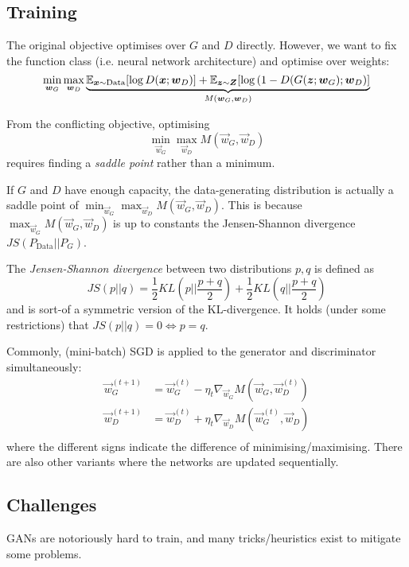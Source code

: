 \subsection{Training}
The original objective optimises over
$G$ and $D$ directly.
However, we want to fix the function class
(i.e. neural network architecture)
and optimise over weights:
\begin{equation*}
\min_{\boldsymbol{w}_G}{\max_{\boldsymbol{w}_D}{
		\underbrace{
			\mathbb{E}_{\boldsymbol{x} \sim \text{Data}}[\log{D(\boldsymbol{x}; \boldsymbol{w}_D)}]
			+
			\mathbb{E}_{\boldsymbol{z} \sim \boldsymbol{Z}}[\log{(1 - D(G(\boldsymbol{z}; \boldsymbol{w}_G); \boldsymbol{w}_D)}]
		}_{M(\boldsymbol{w}_G, \boldsymbol{w}_D)}
}}
\end{equation*}

From the conflicting objective,
optimising
\begin{equation*}
\min_{\vec{w}_G}{\max_{\vec{w}_D}{
		M(\vec{w}_G, \vec{w}_D)
}}
\end{equation*}
requires finding a \emph{saddle point}
rather than a minimum.

If $G$ and $D$ have enough capacity,
the data-generating distribution is
actually a saddle point of
$\min_{\vec{w}_G}{\max_{\vec{w}_D}{M(\vec{w}_G, \vec{w}_D)}}$.
This is because
$\max_{\vec{w}_G}{M(\vec{w}_G, \vec{w}_D)}$ is
up to constants the Jensen-Shannon divergence
$JS(P_\text{Data} || P_G)$.

The \emph{Jensen-Shannon divergence} between
two distributions $p, q$ is defined as
\begin{equation*}
JS(p || q) =
\frac{1}{2} KL(p || \frac{p+q}{2})
+
\frac{1}{2} KL(q || \frac{p+q}{2})
\end{equation*}
and is sort-of a symmetric version
of the KL-divergence.
It holds (under some restrictions) that
$JS(p || q) = 0 \Leftrightarrow p = q$.

Commonly, (mini-batch) SGD is applied to
the generator and discriminator simultaneously:
\begin{align*}
\vec{w}_G^{(t+1)} &= \vec{w}_G^{(t)} - \eta_t \nabla_{\vec{w}_G} M(\vec{w}_G, \vec{w}_D^{(t)}) \\
\vec{w}_D^{(t+1)} &= \vec{w}_D^{(t)} + \eta_t \nabla_{\vec{w}_D} M(\vec{w}_G^{(t)}, \vec{w}_D) \\
\end{align*}
where the different signs indicate the difference
of minimising/maximising.
There are also other variants where the
networks are updated sequentially.


\subsection{Challenges}
GANs are notoriously hard to train,
and many tricks/heuristics exist to
mitigate some problems.

